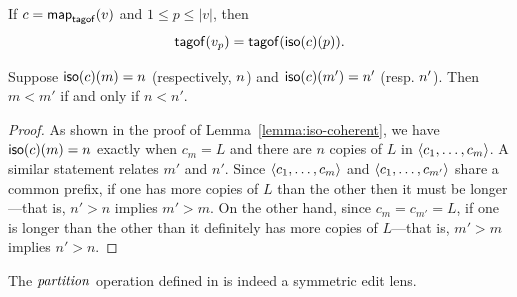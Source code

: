 \begin{corollary}
\label{lemma:iso-tag-index}
If $c=\mathsf{map}_{\mathsf{tagof}}(v)$ and $1 \le p \le |v|$, then
\[\mathsf{tagof}(v_p)=\mathsf{tagof}(\mathsf{iso}(c)(p)).\]
\end{corollary}

\begin{lemma}
\label{lemma:iso-monotonic}
Suppose $\mathsf{iso}(c)(m)= n$ (respectively, $ n$) and
$\mathsf{iso}(c)(m')={n'}$ (resp. ${n'}$). Then $m<m'$ if and only if
$n<n'$.
\end{lemma}

\begin{proof}
    As shown in the proof of Lemma~\ref{lemma:iso-coherent}, we have
    $\mathsf{iso}(c)(m)= n$ exactly when $c_m=L$ and there are $n$ copies of
    $L$ in $\left< c_1 ,\ldots, c_m\right>$. A similar statement relates $m'$
    and $n'$. Since $\left< c_1 ,\ldots, c_m \right>$ and $\left< c_1 ,\ldots,
    c_{m'} \right>$ share a common prefix, if one has more copies of $L$ than
    the other then it must be longer---that is, $n'>n$ implies $m'>m$. On
    the other hand, since $c_m=c_{m'}=L$, if one is longer than the other
    than it definitely has more copies of $L$---that is, $m'>m$ implies
    $n'>n$.
\end{proof}

\begin{theorem}
The $\mathit{partition}$ operation defined in \partitionfigures is indeed a
symmetric edit lens.
\label{goodlens:partition}
\end{theorem}

